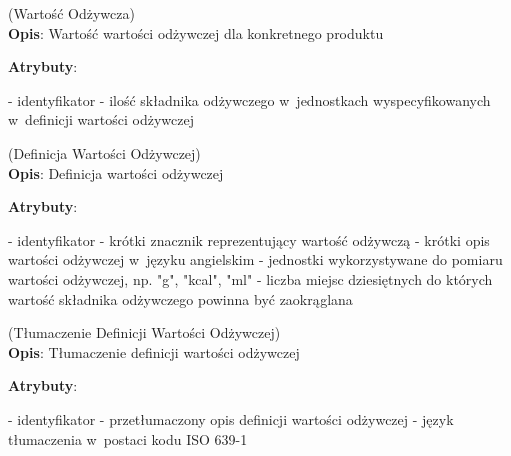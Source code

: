 \begin{enumerate}[label={\textbf{KAT/2/\protect\twodigits{\theenumi}}}, wide, labelwidth=!, labelindent=0pt, labelsep=0pt, series=reqs]
    \label{kat:NutritionData} (Wartość Odżywcza)\\
    \indent\textbf{Opis}: Wartość wartości odżywczej dla konkretnego produktu
    \par
    \textbf{Atrybuty}:
    \begin{itemize}[series=atr, wide, align=left, leftmargin=190pt]
        \label{kat:NutritionData:id}- identyfikator
        \label{kat:NutritionData:nutritionValue}- ilość składnika odżywczego w~jednostkach wyspecyfikowanych w~definicji wartości odżywczej
    \end{itemize}

    \label{kat:NutritionDefinition} (Definicja Wartości Odżywczej)\\
    \indent\textbf{Opis}: Definicja wartości odżywczej
    \par
    \textbf{Atrybuty}:
    \begin{itemize}[series=atr, wide, align=left, leftmargin=190pt]
        \label{kat:NutritionDefinition:id}- identyfikator
        \label{kat:NutritionDefinition:tag}- krótki znacznik reprezentujący wartość odżywczą
        \label{kat:NutritionDefinition:description}- krótki opis wartości odżywczej w~języku angielskim
        \label{kat:NutritionDefinition:units}- jednostki wykorzystywane do pomiaru wartości odżywczej, np. "g", "kcal", "ml"
        \label{kat:NutritionDefinition:decimalPlaces}- liczba miejsc dziesiętnych do których wartość składnika odżywczego powinna być zaokrąglana
    \end{itemize}

    \label{kat:NutritionDefinitionTranslation} (Tłumaczenie Definicji Wartości Odżywczej)\\
    \indent\textbf{Opis}: Tłumaczenie definicji wartości odżywczej
    \par
    \textbf{Atrybuty}:
    \begin{itemize}[series=atr, wide, align=left, leftmargin=190pt]
        \label{kat:NutritionDefinitionTranslation:id}- identyfikator
        \label{kat:NutritionDefinitionTranslation:translation}- przetłumaczony opis definicji wartości odżywczej
        \label{kat:NutritionDefinitionTranslation:language}- język tłumaczenia w~postaci kodu ISO 639-1
    \end{itemize}


\end{enumerate}
